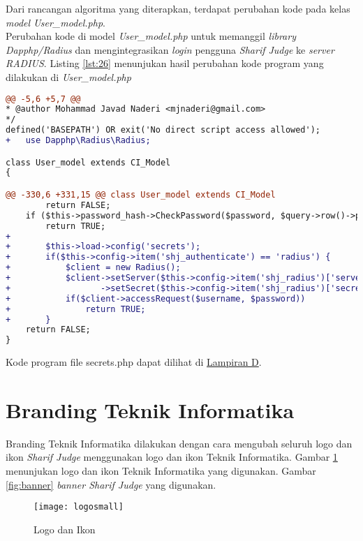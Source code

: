 Dari rancangan algoritma yang diterapkan, terdapat perubahan kode pada kelas \textit{model User\_model.php}.
~\\
Perubahan kode di model \textit{User\_model.php} untuk memanggil \textit{library Dapphp/Radius} dan mengintegrasikan \textit{login} pengguna \textit{Sharif Judge} ke \textit{server RADIUS}. Listing \ref{lst:26} menunjukan hasil perubahan kode program yang dilakukan di \textit{User\_model.php}

\begin{lstlisting}[language=diff, caption=Perubahan kode program pada \textit{User\_model.php}, label=lst:26, basicstyle=\ttfamily, frame=single,
columns=fullflexible, keepspaces=true, breaklines=true]
@@ -5,6 +5,7 @@
* @author Mohammad Javad Naderi <mjnaderi@gmail.com>
*/
defined('BASEPATH') OR exit('No direct script access allowed');
+   use Dapphp\Radius\Radius;

class User_model extends CI_Model
{

@@ -330,6 +331,15 @@ class User_model extends CI_Model
		return FALSE;
	if ($this->password_hash->CheckPassword($password, $query->row()->password))
		return TRUE;
+  
+   	$this->load->config('secrets');
+       if($this->config->item('shj_authenticate') == 'radius') {
+       	$client = new Radius();
+           $client->setServer($this->config->item('shj_radius')['server']) // RADIUS server address
+                  ->setSecret($this->config->item('shj_radius')['secret']);
+           if($client->accessRequest($username, $password))
+           	return TRUE;
+       }
	return FALSE;
}
\end{lstlisting}

Kode program file secrets.php dapat dilihat di \hyperref[lamp:kodeprogramsecrets]{Lampiran D}.

\section{Branding Teknik Informatika}
Branding Teknik Informatika dilakukan dengan cara mengubah seluruh logo dan ikon \textit{Sharif Judge} menggunakan logo dan ikon Teknik Informatika. Gambar \ref{fig:logosmall} menunjukan logo dan ikon Teknik Informatika yang digunakan. Gambar \ref{fig:banner} \textit{banner Sharif Judge} yang digunakan.

\begin{figure}[H]
	\centering  
	\texttt{[image: logosmall]}  
	\caption[Logo dan Ikon]{Logo dan Ikon} 
	\label{fig:logosmall} 
\end{figure} 

